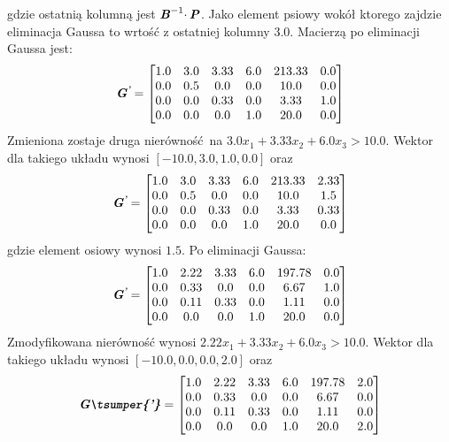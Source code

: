 gdzie ostatnią kolumną jest $\textbf{\textit{B}}^{-1} \cdotp \textbf{\textit{P}}$. Jako element psiowy wokół ktorego zajdzie eliminacja Gaussa to wrtość z ostatniej kolumny $3.0$.
Macierzą po eliminacji Gaussa jest:
\begin{equation*}
  \textbf{\textit{G\textsuperscript{'}}} =
  \begin{bmatrix}
    1.0 & 3.0 & 3.33 & 6.0 & 213.33 & 0.0 \\
    0.0 & 0.5 & 0.0 & 0.0 & 10.0 & 0.0 \\
    0.0 & 0.0 & 0.33 & 0.0 & 3.33 & 1.0 \\
    0.0 & 0.0 & 0.0 & 1.0 & 20.0 & 0.0
  \end{bmatrix}
\end{equation*}
Zmieniona zostaje druga nierówność na $3.0 x_{1}+ 3.33 x_{2}+ 6.0 x_{3} > 10.0$. Wektor  dla takiego układu wynosi $[-10.0,3.0,1.0,0.0]$ oraz
\begin{equation*}
  \textbf{\textit{G\textsuperscript{'}}} =
  \begin{bmatrix}
    1.0 & 3.0 & 3.33 & 6.0 & 213.33 & 2.33 \\
    0.0 & 0.5 & 0.0 & 0.0 & 10.0 & 1.5 \\
    0.0 & 0.0 & 0.33 & 0.0 & 3.33 & 0.33 \\
    0.0 & 0.0 & 0.0 & 1.0 & 20.0 & 0.0
  \end{bmatrix}
\end{equation*}
gdzie element osiowy wynosi $1.5$. Po eliminacji Gaussa:
\begin{equation*}
  \textbf{\textit{G\textsuperscript{'}}} =
  \begin{bmatrix}
    1.0 & 2.22 & 3.33 & 6.0 & 197.78 & 0.0 \\
    0.0 & 0.33 & 0.0 & 0.0 & 6.67 & 1.0 \\
    0.0 & 0.11 & 0.33 & 0.0 & 1.11 & 0.0 \\
    0.0 & 0.0 & 0.0 & 1.0 & 20.0 & 0.0
  \end{bmatrix}
\end{equation*}
Zmodyfikowana nierówność wynosi $ 2.22 x_{1}+ 3.33 x_{2}+ 6.0 x_{3} > 10.0$. Wektor  dla takiego układu wynosi $[-10.0,0.0,0.0,2.0]$ oraz
\begin{equation*}
  \mf{G\tsumper{'}} =
  \begin{bmatrix}
    1.0 & 2.22 & 3.33 & 6.0 & 197.78 & 2.0 \\
    0.0 & 0.33 & 0.0 & 0.0 & 6.67 & 0.0 \\
    0.0 & 0.11 & 0.33 & 0.0 & 1.11 & 0.0 \\
    0.0 & 0.0 & 0.0 & 1.0 & 20.0 & 2.0
  \end{bmatrix}
\end{equation*}
